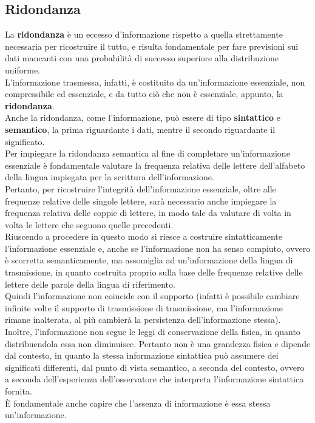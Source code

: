 \documentclass[a4paper]{extarticle}
\begin{document}
\subsection{Ridondanza}
La \textbf{ridondanza} è un eccesso d'informazione rispetto a quella strettamente necessaria per ricostruire il tutto, e risulta fondamentale per fare previsioni sui dati mancanti con una probabilità di successo superiore alla distribuzione uniforme.\\
L'informazione trasmessa, infatti, è costituito da un'informazione essenziale, non compressibile ed essenziale, e da tutto ciò che non è essenziale, appunto, la \textbf{ridondanza}.\\
Anche la ridondanza, come l'informazione, può essere di tipo \textbf{sintattico} e \textbf{semantico}, la prima riguardante i dati, mentre il secondo riguardante il significato.\\
Per impiegare la ridondanza semantica al fine di completare un'informazione essenziale è fondamentale valutare la frequenza relativa delle lettere dell'alfabeto della lingua impiegata per la scrittura dell'informazione.\\
Pertanto, per ricostruire l'integrità dell'informazione essenziale, oltre alle frequenze relative delle singole lettere, sarà necessario anche impiegare la frequenza relativa delle coppie di lettere, in modo tale da valutare di volta in volta le lettere che seguono quelle precedenti.\\
Riuscendo a procedere in questo modo si riesce a costruire sintatticamente l'informazione essenziale e, anche se l'informazione non ha senso compiuto, ovvero è scorretta semanticamente, ma assomiglia ad un'informazione della lingua di trasmissione, in quanto costruita proprio sulla base delle frequenze relative delle lettere delle parole della lingua di riferimento.\\
Quindi l'informazione non coincide con il supporto (infatti è possibile cambiare infinite volte il supporto di trasmissione di trasmissione, ma l'informazione rimane inalterata, al più cambierà la persistenza dell'informazione stessa).\\
Inoltre, l'informazione non segue le leggi di conservazione della fisica, in quanto distribuendola essa non diminuisce. Pertanto non è una grandezza fisica e dipende dal contesto, in quanto la stessa informazione sintattica può assumere dei significati differenti, dal punto di vista semantico, a seconda del contesto, ovvero a seconda dell'esperienza dell'osservatore che interpreta l'informazione sintattica fornita.\\
È fondamentale anche capire che l'assenza di informazione è essa stessa un'informazione.
\end{document}
